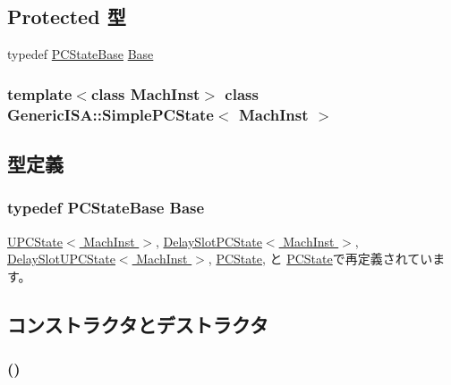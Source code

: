 \subsection*{Protected 型}
\begin{DoxyCompactItemize}
\item 
typedef \hyperlink{classGenericISA_1_1PCStateBase}{PCStateBase} \hyperlink{classGenericISA_1_1SimplePCState_aa75666a3abd25e3bd389680193c6e8e6}{Base}
\end{DoxyCompactItemize}
\subsubsection*{template$<$class MachInst$>$ class GenericISA::SimplePCState$<$ MachInst $>$}



\subsection{型定義}
\hypertarget{classGenericISA_1_1SimplePCState_aa75666a3abd25e3bd389680193c6e8e6}{
\subsubsection[{Base}]{\setlength{\rightskip}{0pt plus 5cm}typedef {\bf PCStateBase} {\bf Base}}}
\label{classGenericISA_1_1SimplePCState_aa75666a3abd25e3bd389680193c6e8e6}


\hyperlink{classGenericISA_1_1UPCState_a6d61e15302422cb743d88ee2ca4fd482}{UPCState$<$ MachInst $>$}, \hyperlink{classGenericISA_1_1DelaySlotPCState_a6d61e15302422cb743d88ee2ca4fd482}{DelaySlotPCState$<$ MachInst $>$}, \hyperlink{classGenericISA_1_1DelaySlotUPCState_a79462b82fdf9d7f85047aab294b849d8}{DelaySlotUPCState$<$ MachInst $>$}, \hyperlink{classNullISA_1_1PCState_aa6c21965de6773cbfc732c23d7263a9f}{PCState}, と \hyperlink{classX86ISA_1_1PCState_aa6c21965de6773cbfc732c23d7263a9f}{PCState}で再定義されています。

\subsection{コンストラクタとデストラクタ}
\hypertarget{classGenericISA_1_1SimplePCState_ade74699701e72921ce51377b7fb0fcd8}{
\subsubsection[{SimplePCState}]{ ()}}
\label{classGenericISA_1_1SimplePCState_ade74699701e72921ce51377b7fb0fcd8}



